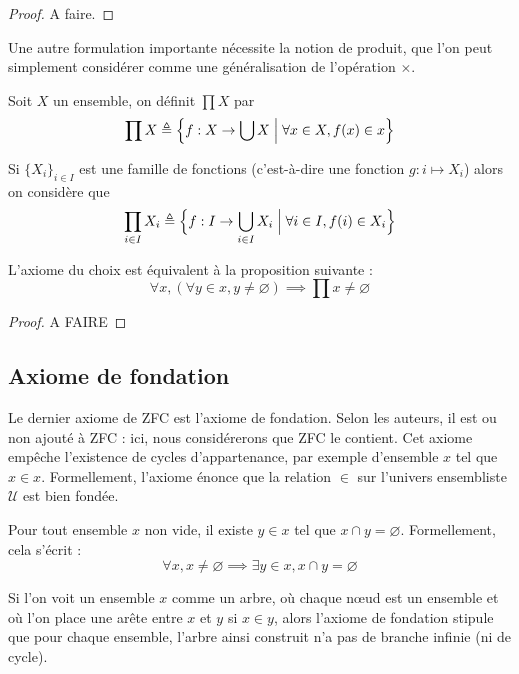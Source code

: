 \begin{proof}
  A faire.
\end{proof}

Une autre formulation importante nécessite la notion de produit, que l'on peut
simplement considérer comme une généralisation de l'opération $\times$.

\begin{definition}
  Soit $X$ un ensemble, on définit $\prod X$ par
  \[\prod X \triangleq \Big\{f : X \to \bigcup X \;\Big|\; \forall x \in X, f(x)\in
  x\Big\}\]

  Si $\{X_i\}_{i\in I}$ est une famille de fonctions (c'est-à-dire une fonction
  $g : i \mapsto X_i$) alors on considère que
  \[\prod_{i\in I} X_i \triangleq \Big\{ f : I \to \bigcup_{i\in I} X_i\;\Big|\;
  \forall i \in I, f(i) \in X_i\Big\}\]
\end{definition}

\begin{proposition}
  L'axiome du choix est équivalent à la proposition suivante :
  \[\forall x, (\forall y \in x, y \neq \varnothing) \implies
  \prod x \neq \varnothing\]
\end{proposition}

\begin{proof}
  A FAIRE
\end{proof}

\subsection{Axiome de fondation}

Le dernier axiome de ZFC est l'axiome de fondation. Selon les auteurs, il est ou
non ajouté à ZFC : ici, nous considérerons que ZFC le contient. Cet axiome
empêche l'existence de cycles d'appartenance, par exemple d'ensemble $x$ tel que
$x\in x$. Formellement, l'axiome énonce que la relation $\in$ sur l'univers
ensembliste $\mathcal U$ est bien fondée.

\begin{axiom}[Fondation]
  Pour tout ensemble $x$ non vide, il existe $y\in x$ tel que
  $x\cap y = \varnothing$. Formellement, cela s'écrit :
  \[\forall x, x\neq\varnothing \implies \exists y \in x, x\cap y =
  \varnothing\]
\end{axiom}

Si l'on voit un ensemble $x$ comme un arbre, où chaque n\oe ud est un ensemble
et où l'on place une arête entre $x$ et $y$ si $x\in y$, alors l'axiome de
fondation stipule que pour chaque ensemble, l'arbre ainsi construit n'a pas de
branche infinie (ni de cycle).

